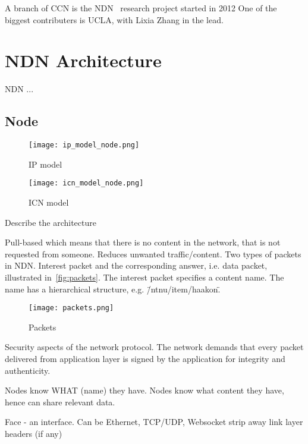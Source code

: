 A branch of \gls{CCN} is the \gls{NDN}~\cite{DBLP:journals/ccr/0001ABJcCPWZ14} research project started in 2012
One of the biggest contributers is \gls{UCLA}, with Lixia Zhang in the lead.

\section{NDN Architecture}\label{chp2:sec:ndn_architecture}
\gls{NDN} ...


\subsection{Node}
\begin{figure}[ht]
  \centering
  \texttt{[image: ip\_model\_node.png]}
  \caption{\gls{IP} model}
  \label{fig:ip-model-node}
\end{figure}

\begin{figure}[ht]
  \centering
  \texttt{[image: icn\_model\_node.png]}
  \caption{\gls{ICN} model }
  \label{fig:icn-model-node}
\end{figure}

Describe the architecture ~\cite{NDN-0021}

Pull-based which means that there is no content in the network, that is not requested from someone.
Reduces unwanted traffic/content. 
Two types of packets in \gls{NDN}. Interest packet and the corresponding answer, i.e. data packet, illustrated in~\autoref{fig:packets}.
The interest packet specifies a content name. The name has a hierarchical structure, e.g. \"/ntnu/item/haakon\".  
\begin{figure}[ht]
  \centering
  \texttt{[image: packets.png]}
  \caption{Packets}
  \label{fig:packets}
\end{figure}

Security aspects of the network protocol. 
The network demands that every packet delivered from application layer is signed by the application for integrity and authenticity.

Nodes know WHAT (name) they have. 
Nodes know what content they have, hence can share relevant data.

Face - an interface. Can be Ethernet, TCP/UDP, Websocket
strip away link layer headers (if any)

